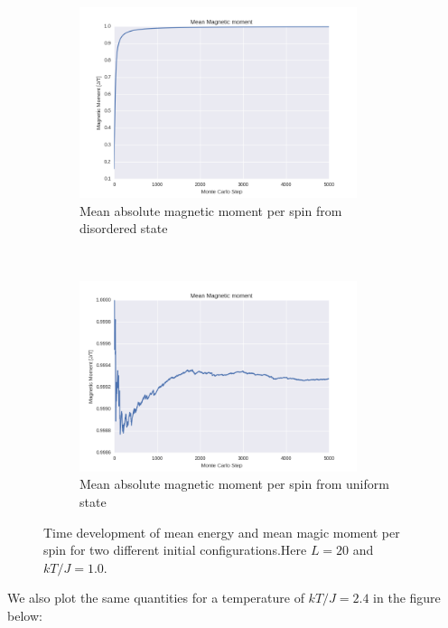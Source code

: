 \documentclass[a4paper, 10pt]{article}
\begin{document}
\begin{figure}[!ht]
\begin{subfigure}[H!]{0.5\textwidth}
        \centering
        \includegraphics[height=2.2in]{meanMagMomWRandomStart.png}
        \caption{Mean absolute magnetic moment per spin from disordered state}
    \end{subfigure}%
    ~ 
    \begin{subfigure}[H!]{0.5\textwidth}
        \centering
        \includegraphics[height=2.2in]{meanMagMomWUpStart.png}
        \caption{Mean absolute magnetic moment per spin from uniform state}
    \end{subfigure}
      \caption{Time development of mean energy and mean magic moment per spin for two different initial configurations.Here $L=20$ and $kT/J=1.0$.}\label{fig:20x20_Sweep_T_1}
\end{figure}
We also plot the same quantities for a temperature of $kT/J=2.4$ in the figure below:
\end{document}
